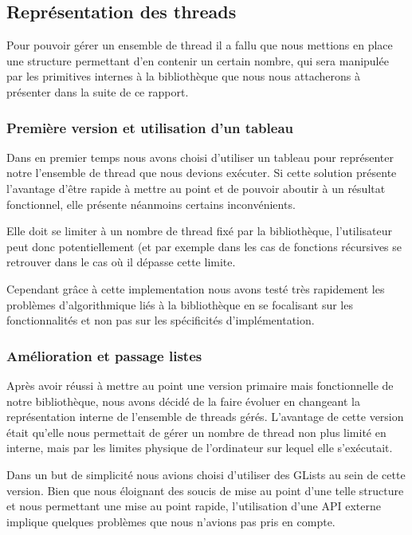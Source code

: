 \documentclass{article}
\begin{document}
		\subsection{Représentation des threads}
		Pour pouvoir gérer un ensemble de thread il a fallu que nous
        mettions en place une structure permettant d'en contenir un
        certain nombre, qui sera manipulée par les primitives internes
        à la bibliothèque que nous nous attacherons à présenter dans
        la suite de ce rapport.

			\subsubsection{Première version et utilisation d'un tableau}
			Dans en premier temps nous avons choisi d'utiliser un
            tableau pour représenter notre l'ensemble de thread que
            nous devions exécuter.  Si cette solution présente
            l'avantage d'être rapide à mettre au point et de pouvoir
            aboutir à un résultat fonctionnel, elle présente néanmoins
            certains inconvénients.
			
			Elle doit se limiter à un nombre de thread fixé par la
            bibliothèque, l'utilisateur peut donc potentiellement (et
            par exemple dans les cas de fonctions récursives se
            retrouver dans le cas où il dépasse cette limite.
			
			Cependant grâce à cette implementation nous avons testé
            très rapidement les problèmes d'algorithmique liés à la
            bibliothèque en se focalisant sur les fonctionnalités et
            non pas sur les spécificités d'implémentation.

			\subsubsection{Amélioration et passage listes}
			Après avoir réussi à mettre au point une version primaire
            mais fonctionnelle de notre bibliothèque, nous avons décidé
            de la faire évoluer en changeant la représentation
            interne de l'ensemble de threads gérés.  L'avantage de
            cette version était qu'elle nous permettait de gérer un
            nombre de thread non plus limité en interne, mais par les
            limites physique de l'ordinateur sur lequel elle
            s'exécutait.
			
			Dans un but de simplicité nous avions choisi d'utiliser
            des GLists au sein de cette version. Bien que nous
            éloignant des soucis de mise au point d'une telle
            structure et nous permettant une mise au point rapide,
            l'utilisation d'une API externe implique quelques
            problèmes que nous n'avions pas pris en compte.
			
\end{document}
